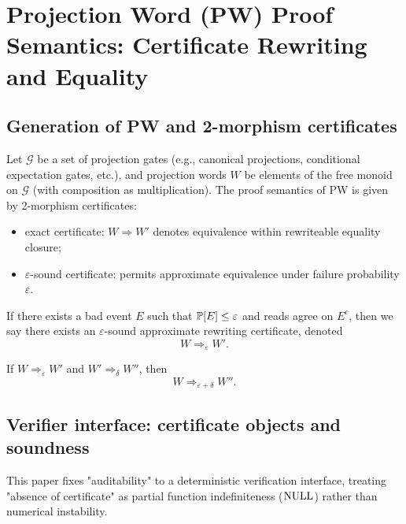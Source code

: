\section{Projection Word (PW) Proof Semantics: Certificate Rewriting and Equality}\label{sec:projword}

\subsection{Generation of PW and 2-morphism certificates}
Let $\mathcal{G}$ be a set of projection gates (e.g., canonical projections, conditional expectation gates, etc.), and projection words $W$ be elements of the free monoid on $\mathcal{G}$ (with composition as multiplication). The proof semantics of PW is given by 2-morphism certificates:
\begin{itemize}
  \item exact certificate: $W\Rightarrow W'$ denotes equivalence within rewriteable equality closure;
  \item $\varepsilon$-sound certificate: permits approximate equivalence under failure probability $\varepsilon$.
\end{itemize}

\begin{definition}\label{def:eps-sound}
If there exists a bad event $E$ such that $\mathbb{P}[E]\le \varepsilon$ and reads agree on $E^c$, then we say there exists an $\varepsilon$-sound approximate rewriting certificate, denoted
$$
W \Rightarrow_\varepsilon W'.
$$
\end{definition}

\begin{proposition}\label{prop:eps-add}
If $W\Rightarrow_\varepsilon W'$ and $W'\Rightarrow_\delta W''$, then
$$
W\Rightarrow_{\varepsilon+\delta} W''.
$$
\end{proposition}

\subsection{Verifier interface: certificate objects and soundness}\label{subsec:pw-verifier-interface}
This paper fixes "auditability" to a deterministic verification interface, treating "absence of certificate" as partial function indefiniteness ($\mathrm{NULL}$) rather than numerical instability.\par

